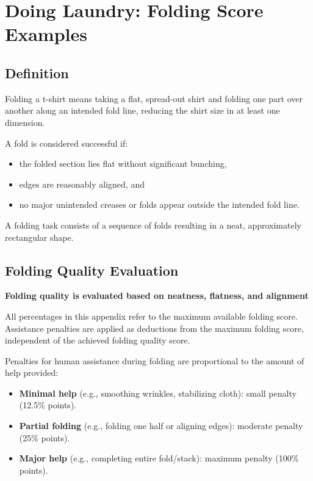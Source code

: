 \chapter{Doing Laundry: Folding Score Examples}\label{app:score-folding}

\captionsetup[subfloat]{margin=1.0em}

\section*{Definition}

Folding a t-shirt means taking a flat, spread-out shirt and folding one part over another along an intended fold line, reducing the shirt size in at least one dimension.

A fold is considered successful if:
\begin{itemize}[nosep]
    \item the folded section lies flat without significant bunching,
    \item edges are reasonably aligned, and
    \item no major unintended creases or folds appear outside the intended fold line.
\end{itemize}

A folding task consists of a sequence of folds resulting in a neat, approximately rectangular shape.


\section*{Folding Quality Evaluation}
\textbf{Folding quality is evaluated based on neatness, flatness, and alignment}

All percentages in this appendix refer to the maximum available folding score. Assistance penalties are applied as deductions from the maximum folding score, independent of the achieved folding quality score.

Penalties for human assistance during folding are proportional to the amount of help provided:
\begin{itemize}
    \item \textbf{Minimal help} (e.g., smoothing wrinkles, stabilizing cloth): small penalty (12.5\% points).
    \item \textbf{Partial folding} (e.g., folding one half or aligning edges): moderate penalty (25\% points).
    \item \textbf{Major help} (e.g., completing entire fold/stack): maximum penalty (100\% points).
\end{itemize}

